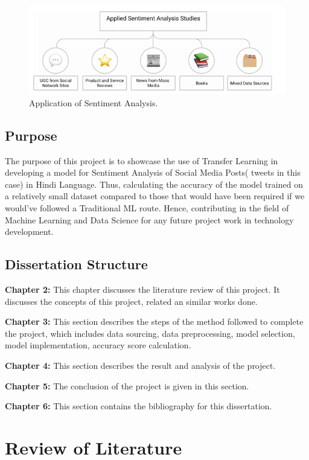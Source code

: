 \documentclass[a4paper, 12pt]{article}
\begin{document}
\begin{sloppypar}
\begin{figure}[H]
\begin{center}
\includegraphics[scale=0.7]{cat.png}
\caption{Application of Sentiment Analysis. \label{cat}} %
\end{center}
\end{figure}

\subsection{Purpose}

The purpose of this project is to showcase the use of Transfer Learning in developing a model for Sentiment Analysis of Social Media Posts( tweets in this case) in Hindi Language. Thus, calculating the accuracy of the model trained on a relatively small dataset compared to those that would have been required if we would've followed a Traditional ML route. Hence, contributing in the field of Machine Learning and Data Science for any future project work in technology development.

\subsection{Dissertation Structure}
\textbf{Chapter 2:} This chapter discusses the literature review of this project. It discusses the concepts of this project, related an similar works done.

\textbf{Chapter 3:} This section describes the steps of the method followed to complete the project, which includes data sourcing, data preprocessing, model selection, model implementation, accuracy score calculation.

\textbf{Chapter 4:} This section describes the result and analysis of the project.

\textbf{Chapter 5:} The conclusion of the project is given in this section.

\textbf{Chapter 6:} This section contains the bibliography for this dissertation.
\clearpage

\section {Review of Literature}

\clearpage
\printbibliography
\clearpage

\end{sloppypar}
\end{document}
